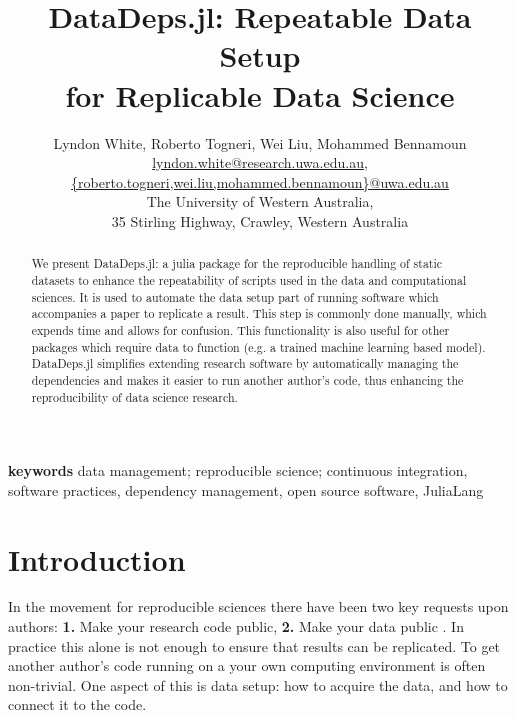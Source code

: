 \documentclass[dvinames]{josr}
\begin{document}
\title{DataDeps.jl: Repeatable Data Setup \\ for Replicable Data Science}
\author{Lyndon White, %
	Roberto Togneri, %
	Wei Liu, %
	Mohammed Bennamoun%
	\\ 
	\url{lyndon.white@research.uwa.edu.au}, \\%
	\url{{roberto.togneri,wei.liu,mohammed.bennamoun}@uwa.edu.au}\\
	The University of Western Australia,\\
	35 Stirling Highway, Crawley, Western Australia
}


\maketitle

\begin{abstract}
	We present DataDeps.jl: a julia package for the reproducible handling of static datasets to enhance the repeatability of scripts used in the data and computational sciences.
	It is used to automate the data setup part of running software which accompanies a paper to replicate a result.
	This step is commonly done manually, which expends time and allows for confusion.
	This functionality is also useful for other packages which require data to function (e.g. a trained machine learning based model).
	DataDeps.jl simplifies extending research software by automatically managing the dependencies and makes it easier to run another author's code, thus enhancing the reproducibility of data science research.
\end{abstract}

\textbf{keywords}
data management;  reproducible science; continuous integration, software practices, dependency management, open source software, \mbox{JuliaLang}


\section{Introduction}

In the movement for reproducible sciences there have been two key requests upon authors:
\textbf{1.} Make your research code public, \textbf{2.} Make your data public \citep{lookafterdata}.
In practice this alone is not enough to ensure that results can be replicated.
To get another author's code running on a your own computing environment is often non-trivial.
One aspect of this is data setup: how to acquire the data, and how to connect it to the code.
\end{document}
